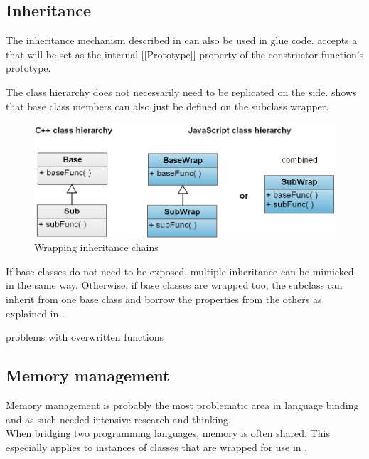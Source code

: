 \subsection{Inheritance}

The inheritance mechanism described in  can also be used in glue code.  accepts a  that will be set as the internal [[Prototype]] property of the constructor function's prototype.

The  class hierarchy does not necessarily need to be replicated on the  side.  shows that base class members can also just be defined on the subclass wrapper.

\begin{figure}[h] %
	\centering
		\includegraphics[scale=0.3]{Images/InheritanceWrapping.png}
	\caption{Wrapping inheritance chains}
	\label{fig:InheritanceWrapping}
\end{figure}

If base classes do not need to be exposed, multiple inheritance can be mimicked in the same way. Otherwise, if base classes are wrapped too, the subclass can inherit from one base class and borrow the properties from the others as explained in .

problems with overwritten functions

\subsection{Memory management}

Memory management is probably the most problematic area in language binding and as such needed intensive research and thinking.\\
When bridging two programming languages, memory is often shared. This especially applies to instances of  classes that are wrapped for use in .

